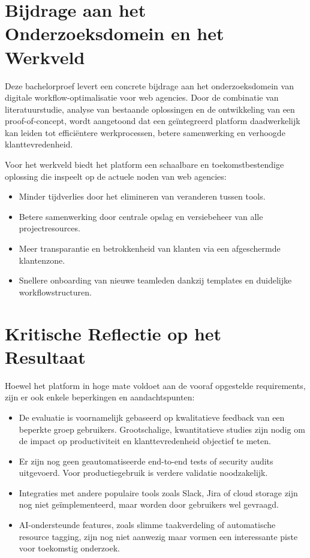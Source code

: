 \section{Bijdrage aan het Onderzoeksdomein en het Werkveld}

Deze bachelorproef levert een concrete bijdrage aan het onderzoeksdomein van digitale workflow-optimalisatie voor web agencies. Door de combinatie van literatuurstudie, analyse van bestaande oplossingen en de ontwikkeling van een proof-of-concept, wordt aangetoond dat een geïntegreerd platform daadwerkelijk kan leiden tot efficiëntere werkprocessen, betere samenwerking en verhoogde klanttevredenheid.

Voor het werkveld biedt het platform een schaalbare en toekomstbestendige oplossing die inspeelt op de actuele noden van web agencies:
\begin{itemize}
    \item Minder tijdverlies door het elimineren van veranderen tussen tools.
    \item Betere samenwerking door centrale opslag en versiebeheer van alle projectresources.
    \item Meer transparantie en betrokkenheid van klanten via een afgeschermde klantenzone.
    \item Snellere onboarding van nieuwe teamleden dankzij templates en duidelijke workflowstructuren.
\end{itemize}

\section{Kritische Reflectie op het Resultaat}

Hoewel het platform in hoge mate voldoet aan de vooraf opgestelde requirements, zijn er ook enkele beperkingen en aandachtspunten:
\begin{itemize}
    \item De evaluatie is voornamelijk gebaseerd op kwalitatieve feedback van een beperkte groep gebruikers. Grootschalige, kwantitatieve studies zijn nodig om de impact op productiviteit en klanttevredenheid objectief te meten.
    \item Er zijn nog geen geautomatiseerde end-to-end tests of security audits uitgevoerd. Voor productiegebruik is verdere validatie noodzakelijk.
    \item Integraties met andere populaire tools zoals Slack, Jira of cloud storage zijn nog niet geïmplementeerd, maar worden door gebruikers wel gevraagd.
    \item AI-ondersteunde features, zoals slimme taakverdeling of automatische resource tagging, zijn nog niet aanwezig maar vormen een interessante piste voor toekomstig onderzoek.
\end{itemize}

